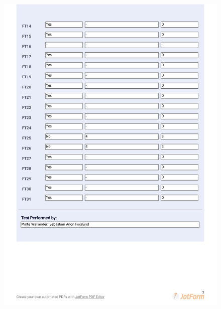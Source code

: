 \documentclass{article}
\begin{document}
 \begin{figure}
     \centering
     \includegraphics[width=13cm]{images/2021-03-04_Malte_ST2-2}
     \renewcommand\figurename{Figure}
     \label{fig:my_label}
 \end{figure}
 
\end{document}
